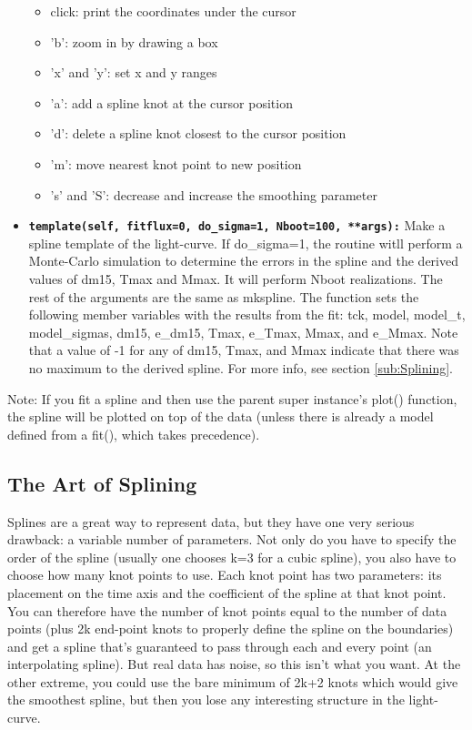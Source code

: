\documentclass[12pt]{article}
\begin{document}
\begin{itemize}
\begin{itemize}
\item click: print the coordinates under the cursor
\item 'b': zoom in by drawing a box
\item 'x' and 'y': set x and y ranges
\item 'a': add a spline knot at the cursor position
\item 'd': delete a spline knot closest to the cursor position
\item 'm': move nearest knot point to new position
\item 's' and 'S': decrease and increase the smoothing parameter
\end{itemize}
\item \texttt{\textbf{template(self, fitflux=0, do\_sigma=1, Nboot=100,
{*}{*}args):}} Make a spline template of the light-curve. If do\_sigma=1,
the routine witll perform a Monte-Carlo simulation to determine the
errors in the spline and the derived values of dm15, Tmax and Mmax.
It will perform Nboot realizations. The rest of the arguments are
the same as mkspline. The function sets the following member variables
with the results from the fit: tck, model, model\_t, model\_sigmas,
dm15, e\_dm15, Tmax, e\_Tmax, Mmax, and e\_Mmax. Note that a value
of -1 for any of dm15, Tmax, and Mmax indicate that there was no maximum
to the derived spline. For more info, see section \ref{sub:Splining}.
\end{itemize}
Note: If you fit a spline and then use the parent super instance's
plot() function, the spline will be plotted on top of the data (unless
there is already a model defined from a fit(), which takes precedence).


\subsection{The Art of Splining \label{sub:Splining}}

Splines are a great way to represent data, but they have one very
serious drawback: a variable number of parameters. Not only do you
have to specify the order of the spline (usually one chooses k=3 for
a cubic spline), you also have to choose how many knot points to use.
Each knot point has two parameters: its placement on the time axis
and the coefficient of the spline at that knot point. You can therefore
have the number of knot points equal to the number of data points
(plus 2k end-point knots to properly define the spline on the boundaries)
and get a spline that's guaranteed to pass through each and every
point (an interpolating spline). But real data has noise, so this
isn't what you want. At the other extreme, you could use the bare
minimum of 2k+2 knots which would give the smoothest spline, but then
you lose any interesting structure in the light-curve.
\end{document}
